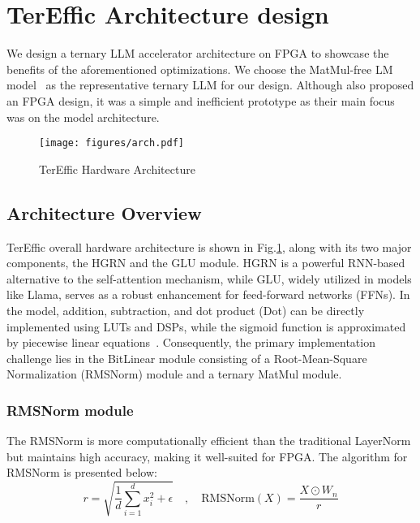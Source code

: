 \section{TerEffic Architecture design}
\label{sec:archi}
We design a ternary LLM accelerator architecture on FPGA to showcase the benefits of the aforementioned optimizations. We choose the MatMul-free LM model~\cite{scalable} as the representative ternary LLM for our design. Although \cite{scalable} also proposed an FPGA design, it was a simple and inefficient prototype as their main focus was on the model architecture. 

\begin{figure}[h]
    \centering
    \vspace{-3mm}
    \texttt{[image: figures/arch.pdf]}
    \caption{TerEffic Hardware Architecture}
    \label{fig:model}
    \vspace{-6mm}
\end{figure}

\subsection{Architecture Overview}

TerEffic overall hardware architecture is shown in Fig.\ref{fig:model}, along with its two major components, the HGRN\cite{HGRN} and the GLU\cite{glu} module. HGRN is a powerful RNN-based alternative to the self-attention mechanism\cite{attention}, while GLU, widely utilized in models like Llama\cite{llama}, serves as a robust enhancement for feed-forward networks (FFNs).
In the model, addition, subtraction, and dot product (Dot) can be directly implemented using LUTs and DSPs, while the sigmoid function is approximated by piecewise linear equations~\cite{sigmoid}. Consequently, the primary implementation challenge lies in the BitLinear module consisting of a Root-Mean-Square Normalization (RMSNorm) module and a ternary MatMul module.
\subsubsection{RMSNorm module}
The RMSNorm\cite{RMSNorm} is more computationally efficient than the traditional LayerNorm\cite{attention} but maintains high accuracy, making it well-suited for FPGA. The algorithm for RMSNorm is presented below:
\vspace{-1mm}
\begin{equation}
        r = \sqrt{\frac{1}{d} \sum_{i=1}^d x_i^2 + \epsilon} \quad , \quad 
        \text{RMSNorm}(X) = \frac{X\odot W_n}{r}
\label{eq:RMSNorm}
\end{equation}
\vspace{-1mm}

